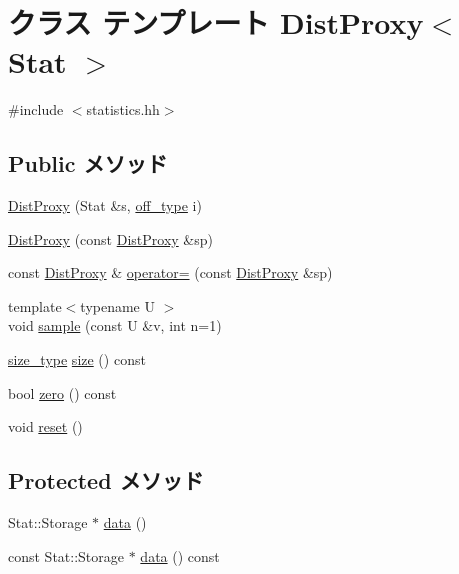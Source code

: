 \hypertarget{classStats_1_1DistProxy}{
\section{クラス テンプレート DistProxy$<$ Stat $>$}
\label{classStats_1_1DistProxy}
}


{\ttfamily \#include $<$statistics.hh$>$}\subsection*{Public メソッド}
\begin{DoxyCompactItemize}
\item 
\hyperlink{classStats_1_1DistProxy_a839bbf60b388028699273aef0649d7ac}{DistProxy} (Stat \&s, \hyperlink{namespaceStats_a2773c9fa9e4b0b04a46b37494b44842a}{off\_\-type} i)
\item 
\hyperlink{classStats_1_1DistProxy_aa288261bae5dd79ea81bce1a034def5b}{DistProxy} (const \hyperlink{classStats_1_1DistProxy}{DistProxy} \&sp)
\item 
const \hyperlink{classStats_1_1DistProxy}{DistProxy} \& \hyperlink{classStats_1_1DistProxy_a43c66cb1a1220e52adc877f888c06265}{operator=} (const \hyperlink{classStats_1_1DistProxy}{DistProxy} \&sp)
\item 
{\footnotesize template$<$typename U $>$ }\\void \hyperlink{classStats_1_1DistProxy_afed4e1e09f566c5aa9e972d8c17b5a27}{sample} (const U \&v, int n=1)
\item 
\hyperlink{namespaceStats_ada51e68d31936547d3729c82daf6b7c6}{size\_\-type} \hyperlink{classStats_1_1DistProxy_a503ab01f6c0142145d3434f6924714e7}{size} () const 
\item 
bool \hyperlink{classStats_1_1DistProxy_a4e72b01b727d3165e75cba84eb507491}{zero} () const 
\item 
void \hyperlink{classStats_1_1DistProxy_ad20897c5c8bd47f5d4005989bead0e55}{reset} ()
\end{DoxyCompactItemize}
\subsection*{Protected メソッド}
\begin{DoxyCompactItemize}
\item 
Stat::Storage $\ast$ \hyperlink{classStats_1_1DistProxy_a7ce67fb80d4a7446971407d9b350be5f}{data} ()
\item 
const Stat::Storage $\ast$ \hyperlink{classStats_1_1DistProxy_a5025236c916e720264cddac3d4fc826d}{data} () const 
\end{DoxyCompactItemize}
